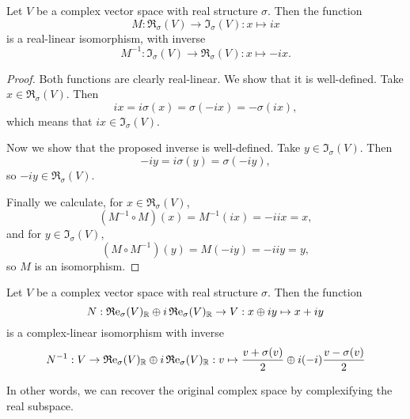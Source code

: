 \begin{lemma} \label{realImaginarySubspacesIsomorphic}
Let $V$ be a complex vector space with real structure $\sigma$. Then the function
\[ M: \Re_\sigma(V) \to \Im_\sigma(V): x \mapsto ix \]
is a real-linear isomorphism, with inverse
\[ M^{-1}: \Im_\sigma(V) \to \Re_\sigma(V): x \mapsto -ix. \]
\end{lemma}
\begin{proof}
Both functions are clearly real-linear. We show that it is well-defined. Take $x\in \Re_\sigma(V)$. Then
\[ ix = i\sigma(x) = \sigma(-ix) = -\sigma(ix), \]
which means that $ix\in \Im_\sigma(V)$.

Now we show that the proposed inverse is well-defined. Take $y\in \Im_\sigma(V)$. Then
\[ -iy = i\sigma(y) = \sigma(-iy), \]
so $-iy \in \Re_\sigma(V)$.

Finally we calculate, for $x\in \Re_\sigma(V)$,
\[ (M^{-1}\circ M)(x) = M^{-1}(ix) = -iix = x, \]
and for $y\in \Im_\sigma(V)$,
\[ (M\circ M^{-1})(y) = M(-iy) = -iiy = y, \]
so $M$ is an isomorphism.
\end{proof}

\begin{proposition}
Let $V$ be a complex vector space with real structure $\sigma$. Then the function
\[ N: \operatorname{\mathfrak{R}e}_\sigma(V)_{\mathbb{R}}\oplus i \operatorname{\mathfrak{R}e}_\sigma(V)_{\mathbb{R}} \to V: x\oplus iy \mapsto x+iy \]
is a complex-linear isomorphism with inverse
\[ N^{-1}: V\to \operatorname{\mathfrak{R}e}_\sigma(V)_{\mathbb{R}}\oplus i \operatorname{\mathfrak{R}e}_\sigma(V)_{\mathbb{R}}: v \mapsto \frac{v+\sigma(v)}{2} \oplus i(-i)\frac{v-\sigma(v)}{2} \]
\end{proposition}
In other words, we can recover the original complex space by complexifying the real subspace.

